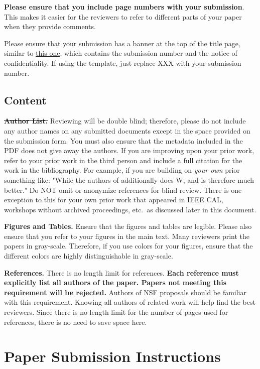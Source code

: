 \documentclass{sig-alternate}
\begin{document}
\textbf{Please ensure that you include page numbers with your
submission}. This makes it easier for the reviewers to refer to different
parts of your paper when they provide comments.

Please ensure that your submission has a banner at the top of the
title page, similar to
\href{http://hpca2018.ece.ucsb.edu/docs/hpca24.pdf}{this one},
which contains the submission number and the notice of
confidentiality.  If using the template, just replace XXX with your
submission number.

\subsection{Content}

\noindent\textbf{\sout{Author List.}} Reviewing will be double blind;
therefore, please do not include any author names on any submitted
documents except in the space provided on the submission form.  You must
also ensure that the metadata included in the PDF does not give away the
authors. If you are improving upon your prior work, refer to your prior
work in the third person and include a full citation for the work in the
bibliography.  For example, if you are building on {\em your own} prior
something like: "While the authors of
additionally does W, and is therefore much better."  Do NOT omit or
anonymize references for blind review.  There is one exception to this for
your own prior work that appeared in IEEE CAL, workshops without archived
proceedings, etc.\, as discussed later in this document.

\noindent\textbf{Figures and Tables.} Ensure that the figures and tables
are legible.  Please also ensure that you refer to your figures in the main
text.  Many reviewers print the papers in gray-scale. Therefore, if you use
colors for your figures, ensure that the different colors are highly
distinguishable in gray-scale.

\noindent\textbf{References.}  There is no length limit for references.
{\bf Each reference must explicitly list all authors of the paper.  Papers
not meeting this requirement will be rejected.} Authors of NSF proposals
should be familiar with this requirement. Knowing all authors of related
work will help find the best reviewers. Since there is no length limit
for the number of pages used for references, there is no need to save space
here.

\section{Paper Submission Instructions}
\end{document}
